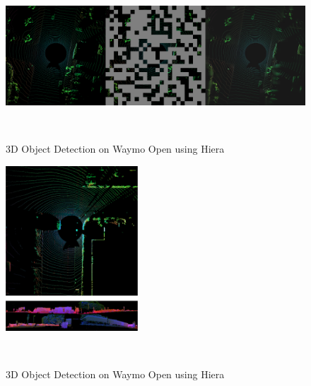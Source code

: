\begin{minipage}[t]{504pt}
\begin{minipage}[t]{350pt}
\end{minipage}
\hspace{13pt}\begin{minipage}[t]{140pt}
\begin{figure}[H]
\includegraphics[width=420pt, angle=270]{pic/Hiera-Waymo.png}
\mainfont\fontsize{9pt}{9pt}\selectfont\caption{ \mainfont\fontsize{9pt}{9pt}\selectfont 3D Object Detection on Waymo Open using Hiera}
~\\[2mm]
\label{fig:mae_img}
\end{figure}
\begin{figure}[H]
\includegraphics[width=140pt]{pic/fusion.png}
\mainfont\fontsize{9pt}{9pt}\selectfont\caption{ \mainfont\fontsize{9pt}{9pt}\selectfont3D Object Detection on Waymo Open using Hiera}
~\\[2mm]
\label{fig:fusion}
\end{figure}
\end{minipage}
\end{minipage}

